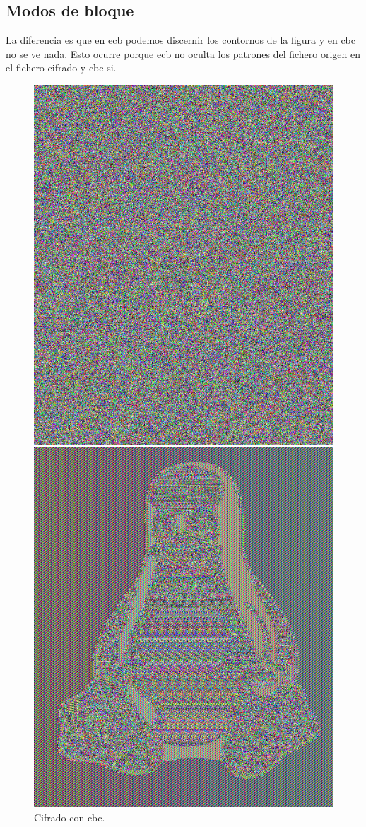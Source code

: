 \documentclass[11pt]{article}
\begin{document}
    \subsection{Modos de bloque}
      \par
      La diferencia es que en ecb podemos discernir los contornos de la figura y en cbc no se ve nada. Esto ocurre porque ecb no oculta los patrones del fichero origen en el fichero cifrado y cbc si.
      \begin{figure}[!ht]
        \begin{minipage}[c]{.5\textwidth}
          \centering
          \includegraphics[width = .8\textwidth]{tux-cbc}
          \caption{Cifrado con cbc.}
        \end{minipage}%
        \begin{minipage}[c]{.5\textwidth}
          \centering
          \includegraphics[width = .8\textwidth]{tux-ecb}

\end{minipage}
\end{figure}
\end{document}
